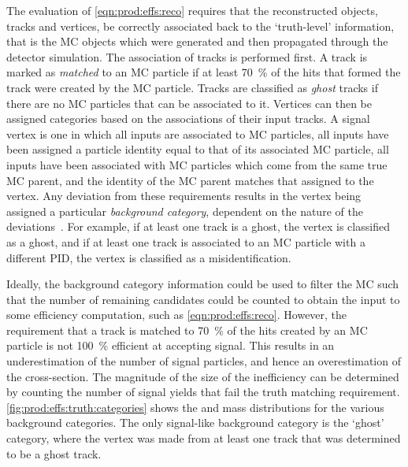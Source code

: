The evaluation of \cref{eqn:prod:effs:reco} requires that the reconstructed objects, tracks and vertices, be correctly associated back to the `truth-level' information, that is the \ac{MC} objects which were generated and then propagated through the detector simulation.
The association of tracks is performed first.
A track is marked as \emph{matched} to an \ac{MC} particle if at least \SI{70}{\percent} of the hits that formed the track were created by the \ac{MC} particle.
Tracks are classified as \emph{ghost} tracks if there are no \ac{MC} particles that can be associated to it.
Vertices can then be assigned categories based on the associations of their input tracks.
A signal vertex is one in which all inputs are associated to \ac{MC} particles, all inputs have been assigned a particle identity equal to that of its associated \ac{MC} particle, all inputs have been associated with \ac{MC} particles which come from the same true \ac{MC} parent, and the identity of the \ac{MC} parent matches that assigned to the vertex.
Any deviation from these requirements results in the vertex being assigned a particular \emph{background category}, dependent on the nature of the deviations~\cite{Gligorov:1035682}.
For example, if at least one track is a ghost, the vertex is classified as a ghost, and if at least one track is associated to an \ac{MC} particle with a different \ac{PID}, the vertex is classified as a misidentification.

Ideally, the background category information could be used to filter the \ac{MC} such that the number of remaining candidates could be counted to obtain the input to some efficiency computation, such as \cref{eqn:prod:effs:reco}.
However, the requirement that a track is matched to \SI{70}{\percent} of the hits created by an \ac{MC} particle is not \SI{100}{\percent} efficient at accepting signal.
This results in an underestimation of the number of signal particles, and hence an overestimation of the cross-section.
The magnitude of the size of the inefficiency can be determined by counting the 
number of signal yields that fail the truth matching requirement.
\cref{fig:prod:effs:truth:categories} shows the \PDzero and \PDplus mass 
distributions for the various background categories.
The only signal-like background category is the `ghost' category,
where the vertex was made from at least one track that was determined to be a ghost track.

